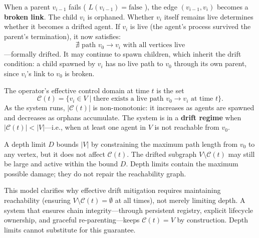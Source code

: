 When a parent $v_{i-1}$ fails ( $L(v_{i-1}) = \text{false}$ ), the edge $(v_{i-1}, v_i)$ becomes a \textbf{broken link}. The child $v_i$ is orphaned. Whether $v_i$ itself remains live determines whether it becomes a drifted agent. If $v_i$ is live (the agent's process survived the parent's termination), it now satisfies:
\[
\nexists \text{ path } v_0 \to v_i \text{ with all vertices live}
\]
—formally drifted. It may continue to spawn children, which inherit the drift condition: a child spawned by $v_i$ has no live path to $v_0$ through its own parent, since $v_i$'s link to $v_0$ is broken.

The operator's effective control domain at time $t$ is the set
\[
\mathcal{C}(t) = \{ v_i \in V \mid \text{there exists a live path } v_0 \to v_i \text{ at time } t \}.
\]
As the system runs, $|\mathcal{C}(t)|$ is non-monotonic: it increases as agents are spawned and decreases as orphans accumulate. The system is in a \textbf{drift regime} when $|\mathcal{C}(t)| < |V|$—i.e., when at least one agent in $V$ is not reachable from $v_0$.

A depth limit $D$ bounds $|V|$ by constraining the maximum path length from $v_0$ to any vertex, but it does not affect $\mathcal{C}(t)$. The drifted subgraph $V \setminus \mathcal{C}(t)$ may still be large and active within the bound $D$. Depth limits contain the maximum possible damage; they do not repair the reachability graph.

This model clarifies why effective drift mitigation requires maintaining reachability (ensuring $V \setminus \mathcal{C}(t) = \emptyset$ at all times), not merely limiting depth. A system that ensures chain integrity—through persistent registry, explicit lifecycle ownership, and graceful re-parenting—keeps $\mathcal{C}(t) = V$ by construction. Depth limits cannot substitute for this guarantee.